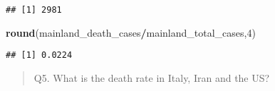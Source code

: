 \documentclass[
]{article}
\newenvironment{Shaded}{\begin{snugshade}}{\end{snugshade}}
\newcommand{\DecValTok}[1]{\textcolor[rgb]{0.00,0.00,0.81}{#1}}
\newcommand{\KeywordTok}[1]{\textcolor[rgb]{0.13,0.29,0.53}{\textbf{#1}}}
\newcommand{\NormalTok}[1]{#1}
\newcommand{\OperatorTok}[1]{\textcolor[rgb]{0.81,0.36,0.00}{\textbf{#1}}}
\newcommand{\StringTok}[1]{\textcolor[rgb]{0.31,0.60,0.02}{#1}}
\begin{document}
\begin{verbatim}
## [1] 2981
\end{verbatim}

\begin{Shaded}
\begin{Highlighting}[]
\KeywordTok{round}\NormalTok{(mainland_death_cases}\OperatorTok{/}\NormalTok{mainland_total_cases,}\DecValTok{4}\NormalTok{)}
\end{Highlighting}
\end{Shaded}

\begin{verbatim}
## [1] 0.0224
\end{verbatim}

\begin{quote}
Q5. What is the death rate in Italy, Iran and the US?
\end{quote}

\begin{Shaded}
\end{Shaded}
\end{document}
